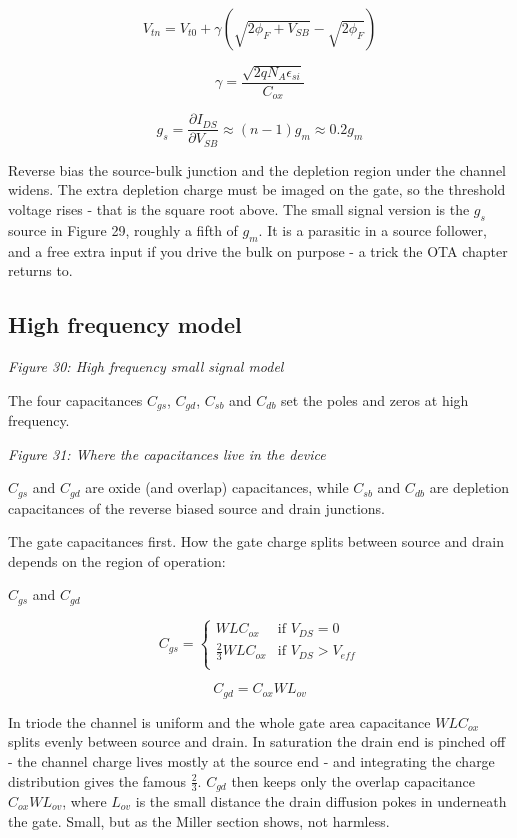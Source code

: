 \[ V_{tn} = V_{t0} + \gamma\left(\sqrt{2\phi_F + V_{SB}} - \sqrt{2\phi_F}\right) \]

\[ \gamma = \frac{\sqrt{2 q N_A \epsilon_{si}}}{C_{ox}} \]

\[ g_{s} = \frac{\partial I_{DS}}{\partial V_{SB}} \approx (n - 1) g_m \approx 0.2 g_m \]

Reverse bias the source-bulk junction and the depletion region under the
channel widens. The extra depletion charge must be imaged on the gate,
so the threshold voltage rises - that is the square root above. The
small signal version is the \(g_s\) source in Figure 29, roughly a fifth
of \(g_m\). It is a parasitic in a source follower, and a free extra
input if you drive the bulk on purpose - a trick the OTA chapter returns
to.

\subsection{High frequency model}\label{high-frequency-model}


{
\centering
{}
}

\emph{Figure 30: High frequency small signal model}

The four capacitances \(C_{gs}\), \(C_{gd}\), \(C_{sb}\) and \(C_{db}\)
set the poles and zeros at high frequency.


{
\centering
{}
}

\emph{Figure 31: Where the capacitances live in the device}

\(C_{gs}\) and \(C_{gd}\) are oxide (and overlap) capacitances, while
\(C_{sb}\) and \(C_{db}\) are depletion capacitances of the reverse
biased source and drain junctions.

The gate capacitances first. How the gate charge splits between source
and drain depends on the region of operation:

\(C_{gs}\) and \(C_{gd}\)

\[
C_{gs} =
\begin{cases}
WLC_{ox} & \text{if }V_{DS} = 0 \\[15pt]
\frac{2}{3}WLC_{ox} & \text{if }V_{DS} > V_{eff} \\[15pt]
\end{cases}
\]

\[ C_{gd} = C_{ox} W L_{ov} \]

In triode the channel is uniform and the whole gate area capacitance
\(WLC_{ox}\) splits evenly between source and drain. In saturation the
drain end is pinched off - the channel charge lives mostly at the source
end - and integrating the charge distribution gives the famous
\(\frac{2}{3}\). \(C_{gd}\) then keeps only the overlap capacitance
\(C_{ox} W L_{ov}\), where \(L_{ov}\) is the small distance the drain
diffusion pokes in underneath the gate. Small, but as the Miller section
shows, not harmless.

